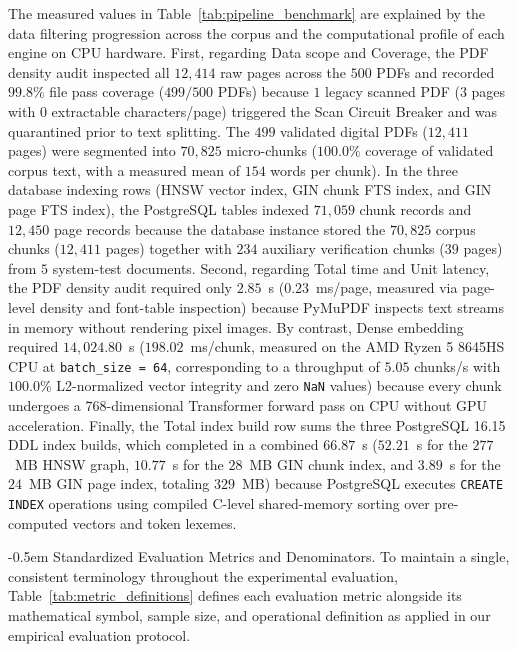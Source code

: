 \documentclass[10pt]{SPIIRAS_Proceedings}
\makeatletter
\renewcommand\subsection{\@startsection{subsection}{2}{\parindent}%
  {\z@}%
  {-0.5em}%
  {\normalfont\normalsize\bfseries}}
\makeatother
\begin{document}
The measured values in Table~\ref{tab:pipeline_benchmark} are explained by the data filtering progression across the corpus and the computational profile of each engine on CPU hardware. First, regarding Data scope and Coverage, the PDF density audit inspected all $12,414$ raw pages across the $500$ PDFs and recorded $99.8\%$ file pass coverage ($499/500$ PDFs) because $1$ legacy scanned PDF ($3$ pages with $0$ extractable characters/page) triggered the Scan Circuit Breaker and was quarantined prior to text splitting. The $499$ validated digital PDFs ($12,411$ pages) were segmented into $70,825$ micro-chunks ($100.0\%$ coverage of validated corpus text, with a measured mean of $154$ words per chunk). In the three database indexing rows (HNSW vector index, GIN chunk FTS index, and GIN page FTS index), the PostgreSQL tables indexed $71,059$ chunk records and $12,450$ page records because the database instance stored the $70,825$ corpus chunks ($12,411$ pages) together with $234$ auxiliary verification chunks ($39$ pages) from $5$ system-test documents. Second, regarding Total time and Unit latency, the PDF density audit required only $2.85$~s ($0.23$~ms/page, measured via page-level density and font-table inspection) because PyMuPDF inspects text streams in memory without rendering pixel images. By contrast, Dense embedding required $14,024.80$~s ($198.02$~ms/chunk, measured on the AMD Ryzen 5 8645HS CPU at \texttt{batch\_size = 64}, corresponding to a throughput of $5.05$ chunks/s with $100.0\%$ L2-normalized vector integrity and zero \texttt{NaN} values) because every chunk undergoes a 768-dimensional Transformer forward pass on CPU without GPU acceleration. Finally, the Total index build row sums the three PostgreSQL 16.15 DDL index builds, which completed in a combined $66.87$~s ($52.21$~s for the $277$~MB HNSW graph, $10.77$~s for the $28$~MB GIN chunk index, and $3.89$~s for the $24$~MB GIN page index, totaling $329$~MB) because PostgreSQL executes \texttt{CREATE INDEX} operations using compiled C-level shared-memory sorting over pre-computed vectors and token lexemes.

\subsection{Standardized Evaluation Metrics and Denominators.} \label{sec:metrics_overview} To maintain a single, consistent terminology throughout the experimental evaluation, Table~\ref{tab:metric_definitions} defines each evaluation metric alongside its mathematical symbol, sample size, and operational definition as applied in our empirical evaluation protocol.
\end{document}
